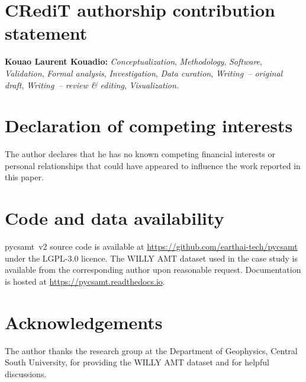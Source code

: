 \documentclass[review,12pt]{elsarticle}
\newcommand{\creditrole}[1]{\textit{#1}}
\begin{document}
\section*{CRediT authorship contribution statement}

\textbf{Kouao Laurent Kouadio:}
\creditrole{Conceptualization},
\creditrole{Methodology},
\creditrole{Software},
\creditrole{Validation},
\creditrole{Formal analysis},
\creditrole{Investigation},
\creditrole{Data curation},
\creditrole{Writing~-- original draft},
\creditrole{Writing~-- review \& editing},
\creditrole{Visualization}.

\section*{Declaration of competing interests}

The author declares that he has no known competing financial interests or
personal relationships that could have appeared to influence the work
reported in this paper.

\section*{Code and data availability}

pycsamt~v2 source code is available at
\url{https://github.com/earthai-tech/pycsamt} under the LGPL-3.0 licence.
The WILLY AMT dataset used in the case study is available from the
corresponding author upon reasonable request.
Documentation is hosted at \url{https://pycsamt.readthedocs.io}.

\section*{Acknowledgements}

The author thanks the research group at the Department of Geophysics,
Central South University, for providing the WILLY AMT dataset and for
helpful discussions.



\end{document}

